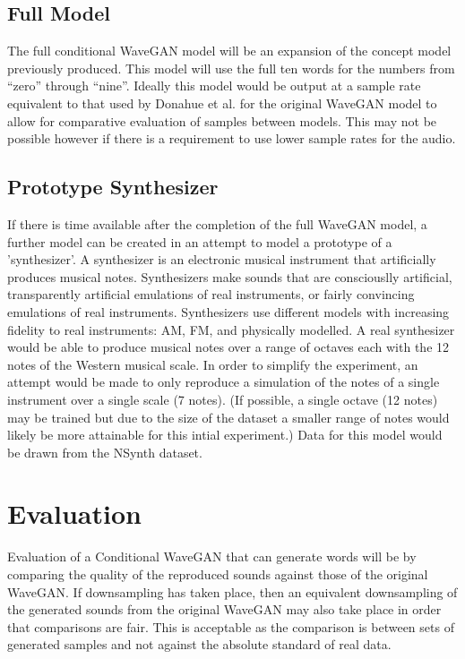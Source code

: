 \documentclass{article}
\begin{document}
\subsection{Full Model}

The full conditional WaveGAN model will be an expansion of the concept model previously produced.
This model will use the full ten words for the numbers from ``zero'' through ``nine''.
Ideally this model would be output at a sample rate equivalent to that used by Donahue et al. for the original WaveGAN model to allow for comparative evaluation of samples between models.
This may not be possible however if there is a requirement to use lower sample rates for the audio.

\subsection{Prototype Synthesizer}

If there is time available after the completion of the full WaveGAN model, a further model can be created in an attempt to model a prototype of a 'synthesizer'.
A synthesizer is an electronic musical instrument that artificially produces musical notes.
Synthesizers make sounds that are consciouslly artificial, transparently artificial emulations of real instruments, or fairly convincing emulations of real instruments.
Synthesizers use different models with increasing fidelity to real instruments: AM, FM, and physically modelled.
\newline
\newline
A real synthesizer would be able to produce musical notes over a range of octaves each with the 12 notes of the Western musical scale.
In order to simplify the experiment, an attempt would be made to only reproduce a simulation of the notes of a single instrument over a single scale (7 notes).
(If possible, a single octave (12 notes) may be trained but due to the size of the dataset a smaller range of notes would likely be more attainable for this intial experiment.)
\newline
\newline
Data for this model would be drawn from the NSynth dataset.

\section{Evaluation}

Evaluation of a Conditional WaveGAN that can generate words will be by comparing the quality of the reproduced sounds against those of the original WaveGAN.
If downsampling has taken place, then an equivalent downsampling of the generated sounds from the original WaveGAN may also take place in order that comparisons are fair.
This is acceptable as the comparison is between sets of generated samples and not against the absolute standard of real data.
\end{document}

